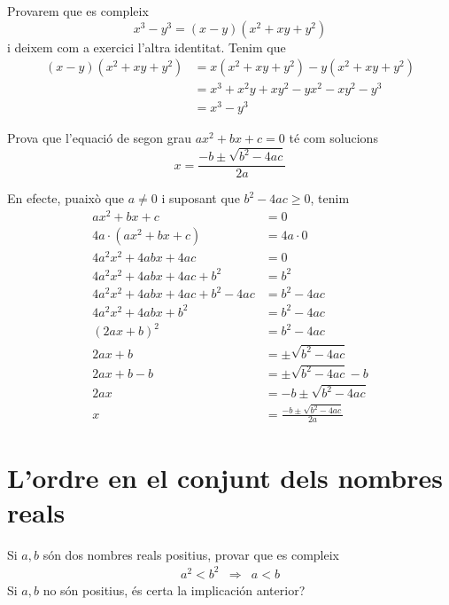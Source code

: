 \begin{solucio}
Provarem que es compleix 
\begin{equation*}
x^{3}-y^{3}=(x-y)(x^{2}+xy+y^{2})
\end{equation*}%
i deixem com a exercici l’altra identitat. Tenim que%
\begin{align*}
(x-y)(x^{2}+xy+y^{2}) &=x(x^{2}+xy+y^{2})-y(x^{2}+xy+y^{2}) \\
&=x^{3}+x^{2}y+xy^{2}-yx^{2}-xy^{2}-y^{3} \\
&=x^{3}-y^{3}
\end{align*}
\end{solucio}

\begin{exercici}
Prova que l’equació de segon grau $ax^{2}+bx+c=0$ té com
solucions 
\begin{equation*}
x=\frac{-b\pm \sqrt{b^{2}-4ac}}{2a}
\end{equation*}

\end{exercici}

\begin{solucio}
En efecte, puaixò que $a\neq 0$ i suposant que $b^{2}-4ac\geq 0$, tenim%
\begin{align*}
ax^{2}+bx+c &=0 \\
4a\cdot (ax^{2}+bx+c) &=4a\cdot 0 \\
4a^{2}x^{2}+4abx+4ac &=0 \\
4a^{2}x^{2}+4abx+4ac+b^{2} &=b^{2} \\
4a^{2}x^{2}+4abx+4ac+b^{2}-4ac &=b^{2}-4ac \\
4a^{2}x^{2}+4abx+b^{2} &=b^{2}-4ac \\
(2ax+b)^{2} &=b^{2}-4ac \\
2ax+b &=\pm \sqrt{b^{2}-4ac} \\
2ax+b-b &=\pm \sqrt{b^{2}-4ac}-b \\
2ax &=-b\pm \sqrt{b^{2}-4ac} \\
x &=\frac{-b\pm \sqrt{b^{2}-4ac}}{2a}
\end{align*}
\end{solucio}

\section{L’ordre en el conjunt dels nombres reals}

\begin{exercici}
Si $a,b$ són dos nombres reals positius, provar que es compleix%
\begin{equation*}
\begin{array}{ccc}
a^{2}<b^{2} & \Longrightarrow & a<b%
\end{array}%
\end{equation*}%
Si $a,b$ no són positius, és certa la implicación
anterior?

\end{exercici}

